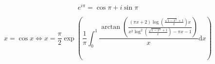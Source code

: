 \begin{frame}[fragile]{}

	\[
		e^{i\pi}=\cos\pi+i\sin\pi
	\]

	\[
		x=\cos x\iff x=\frac{\pi}{2}\exp\left(\frac{1}{\pi}\int_0^1\frac{\arctan\left(\frac{(\pi x+2)\log\left(\frac{\sqrt{1-x^2}+1}{x}\right)x}{x^2\log^2\left(\frac{\sqrt{1-x^2}+1}{x}\right)-\pi x-1}\right)}{x}\mathrm{d}x\right)
	\]

\end{frame}
